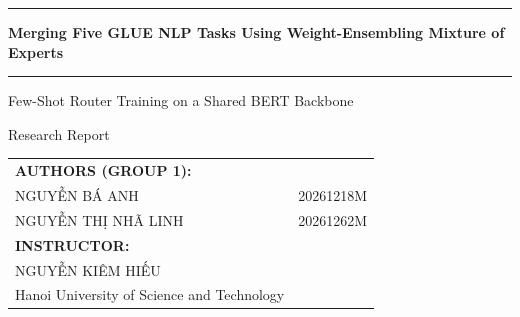 \thispagestyle{empty}
\vspace*{4mm}

\noindent\textcolor{NavyBlue}{\rule{\linewidth}{1pt}}
\begin{center}
	\fontsize{26}{32} \color{NavyBlue} \selectfont
	\textbf{Merging Five GLUE NLP Tasks Using Weight-Ensembling Mixture of Experts}
\end{center}

\noindent\textcolor{NavyBlue}{\rule{\linewidth}{1pt}}

\begin{center}
	\fontsize{17}{21} \selectfont
	Few-Shot Router Training on a Shared BERT Backbone
\end{center}

\vspace*{2mm}
\begin{center}
	\fontsize{14}{14} \selectfont Research Report
\end{center}
\vspace*{6mm}

\begin{center}
	\def\baselinestretch{1.0}\color{NavyBlue}
	{\fontsize{13}{13} \selectfont
		\begin{tabular}{l l}
			{\bf AUTHORS (GROUP 1):} & \\[4mm]
			\hspace{13mm} NGUYỄN BÁ ANH & 20261218M\\[3mm]
			\hspace{13mm} NGUYỄN THỊ NHÃ LINH & 20261262M\\[6mm]
			{\bf INSTRUCTOR:} & \\[4mm]
			\hspace{13mm} NGUYỄN KIÊM HIẾU & \\[6mm]
			\hspace{13mm} Hanoi University of Science and Technology & \\[3mm]
	\end{tabular}}
\end{center}
